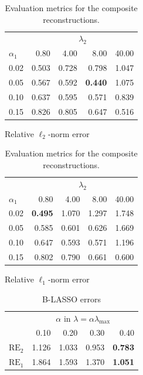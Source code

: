 \documentclass[12pt]{article}
\begin{document}
        \begin{table}[t]
        \centering
        \begin{subtable}[t]{0.45\linewidth}
            \centering
            \begin{tabular}{l|rrrr}
                \toprule
                 & \multicolumn{4}{c}{$\lambda_2$} \\
                \cmidrule(lr){2-5}
                $\alpha_1$ & 0.80 & 4.00 & 8.00 & 40.00 \\
                \midrule
                0.02 & 0.503 & 0.728 & 0.798 & 1.047 \\
                0.05 & 0.567 & 0.592 & \textbf{0.440} & 1.075 \\
                0.10 & 0.637 & 0.595 & 0.571 & 0.839 \\
                0.15 & 0.826 & 0.805 & 0.647 & 0.516 \\
                \bottomrule
            \end{tabular}
            \caption{Relative $\ell_2$-norm error \label{tab:rl2}}
        \end{subtable}
        \hfill
        \begin{subtable}[t]{0.45\linewidth}
            \centering
            \begin{tabular}{l|rrrr}
                \toprule
                 & \multicolumn{4}{c}{$\lambda_2$} \\
                \cmidrule(lr){2-5}
                $\alpha_1$ & 0.80 & 4.00 & 8.00 & 40.00 \\
                \midrule
                0.02 & \textbf{0.495} & 1.070 & 1.297 & 1.748 \\
                0.05 & 0.585 & 0.601 & 0.626 & 1.669 \\
                0.10 & 0.647 & 0.593 & {0.571} & 1.196 \\
                0.15 & 0.802 & 0.790 & 0.661 & 0.600 \\
                \bottomrule
            \end{tabular}
            \caption{Relative $\ell_1$-norm error\label{tab:rl1}}
        \end{subtable}
        \caption{Evaluation metrics for the composite reconstructions.}
        \end{table}
    
        \begin{table}[b]
            \centering
            \begin{tabular}{l|rrrr}
                \toprule
                 & \multicolumn{4}{c}{$\alpha$ in $\lambda = \alpha \lambda_{\mathrm{max}}$} \\
                \cmidrule(lr){2-5}
                 & 0.10 & 0.20 & 0.30 & 0.40 \\
                \midrule
                $\mathrm{RE}_2$ & 1.126 & 1.033 & 0.953 & \textbf{0.783} \\
                $\mathrm{RE}_1$ & 1.864 & 1.593 & 1.370 & \textbf{1.051} \\
                \bottomrule
            \end{tabular}
            \caption{B-LASSO errors \label{tab:blasso}}
        \end{table}
\end{document}
